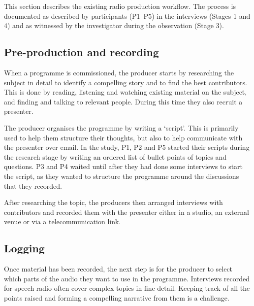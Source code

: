 This section describes the existing radio production workflow. The process is documented as described by participants
(P1--P5) in the interviews (Stages 1 and 4) and as witnessed by the investigator during the observation (Stage 3).

\subsection{Pre-production and recording}
When a programme is commissioned, the producer starts by researching the subject in detail to identify a compelling
story and to find the best contributors. This is done by reading, listening and watching existing material on the
subject, and finding and talking to relevant people. During this time they also recruit a presenter.

The producer organises the programme by writing a `script'. This is primarily used to help them structure their
thoughts, but also to help communicate with the presenter over email.
In the study, P1, P2 and P5 started their scripts during the research stage by writing an ordered list of bullet points
of topics
and questions.  P3 and P4 waited until after they had done some interviews to start the script, as they wanted
to structure the programme around the discussions that they recorded.


After researching the topic, the producers then arranged interviews with contributors and recorded them with the
presenter either in a studio, an external venue or via a telecommunication link.

\subsection{Logging}
Once material has been recorded, the next step is for the producer to select which parts of the audio they want to use
in the programme.  Interviews recorded for speech radio often cover complex topics in fine detail. Keeping track of all
the points raised and forming a compelling narrative from them is a challenge.

